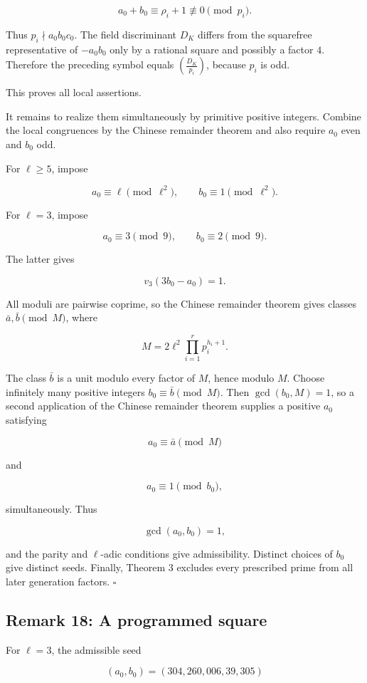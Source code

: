 \documentclass[11pt]{article}
\begin{document}
\[
a_0+b_0
\equiv
\rho_i+1
\not\equiv0
\pmod{p_i}.
\]

Thus \(p_i\nmid a_0b_0c_0\). The field discriminant \(D_K\) differs from
the squarefree representative of \(-a_0b_0\) only by a rational square
and possibly a factor \(4\). Therefore the preceding symbol equals
\(\left(\frac{D_K}{p_i}\right)\), because \(p_i\) is odd.

This proves all local assertions.

It remains to realize them simultaneously by primitive positive integers.
Combine the local congruences by the Chinese remainder theorem and also
require \(a_0\) even and \(b_0\) odd.

For \(\ell\geq5\), impose

\[
a_0\equiv\ell\pmod{\ell^2},
\qquad
b_0\equiv1\pmod{\ell^2}.
\]

For \(\ell=3\), impose

\[
a_0\equiv3\pmod9,
\qquad
b_0\equiv2\pmod9.
\]

The latter gives

\[
v_3(3b_0-a_0)=1.
\]

All moduli are pairwise coprime, so the Chinese remainder theorem gives
classes \(\bar a,\bar b\pmod M\), where

\[
M=2\ell^2\prod_{i=1}^r p_i^{h_i+1}.
\]

The class \(\bar b\) is a unit modulo every factor of \(M\), hence modulo
\(M\). Choose infinitely many positive integers
\(b_0\equiv\bar b\pmod M\). Then \(\gcd(b_0,M)=1\), so a second application
of the Chinese remainder theorem supplies a positive \(a_0\) satisfying

\[
a_0\equiv\bar a\pmod M
\]

and

\[
a_0\equiv1\pmod{b_0},
\]

simultaneously. Thus

\[
\gcd(a_0,b_0)=1,
\]

and the parity and \(\ell\)-adic conditions give admissibility. Distinct
choices of \(b_0\) give distinct seeds. Finally, Theorem 3 excludes every
prescribed prime from all later generation factors. \(\square\)

\subsection{Remark 18: A programmed square}

For \(\ell=3\), the admissible seed

\[
(a_0,b_0)
=
(304{,}260{,}006,39{,}305)
\]
\end{document}
